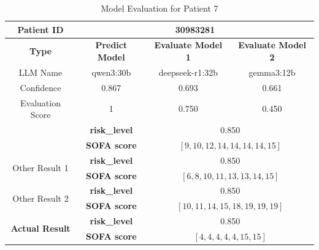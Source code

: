 \begin{table}[htbp]
 \centering
 \caption{Model Evaluation for Patient 7}
 \label{tab:patient7}
 \begin{tabular}{cccc}
 \toprule
 \textbf{ Patient ID } & \multicolumn{3}{c}{30983281} \\
 \midrule
 \textbf{ Type } & \textbf{ Predict Model } & \textbf{ Evaluate Model 1 } & \textbf{ Evaluate Model 2 } \\
 LLM Name & qwen3:30b & deepseek-r1:32b & gemma3:12b \\
 Confidence & 0.867 & 0.693 & 0.661 \\
 Evaluation Score & 1 & 0.750 & 0.450 \\
 \midrule
 \addlinespace
 \multirow{2}{*}{\textbf{ Best Result }} & \textbf{ risk\_level } & \multicolumn{2}{c}{0.850} \\
      & \textbf{ SOFA score } & \multicolumn{2}{c}{$[9, 10, 12, 14, 14, 14, 14, 15]$} \\
 \midrule
 \multirow{2}{*}{Other Result 1} & \textbf{ risk\_level } & \multicolumn{2}{c}{0.850} \\
      & \textbf{ SOFA score } & \multicolumn{2}{c}{$[6, 8, 10, 11, 13, 13, 14, 15]$} \\
 \midrule
 \multirow{2}{*}{Other Result 2} & \textbf{ risk\_level } & \multicolumn{2}{c}{0.850} \\
      & \textbf{ SOFA score } & \multicolumn{2}{c}{$[10, 11, 14, 15, 18, 19, 19, 19]$} \\
 \midrule
 \multirow{2}{*}{\textbf{ Actual Result }} & \textbf{ risk\_level } & \multicolumn{2}{c}{0.850} \\
      & \textbf{ SOFA score } & \multicolumn{2}{c}{$[4, 4, 4, 4, 4, 15, 15]$} \\
 \bottomrule
 \end{tabular}
\end{table}

